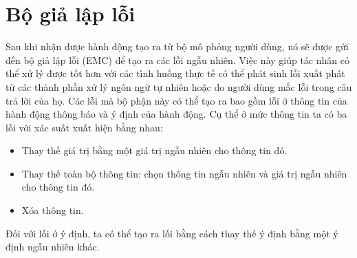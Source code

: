 \section{Bộ giả lập lỗi}
\label{sec:emc}
Sau khi nhận được hành động tạo ra từ bộ mô phỏng người dùng, nó sẽ
được gửi đến bộ giả lập lỗi (EMC) để tạo ra các lỗi ngẫu nhiên.
Việc này giúp tác nhân có thể xử lý được tốt hơn với các tình huống
thực tế có thể phát sinh lỗi xuất phát từ các thành phần xử lý ngôn ngữ
tự nhiên hoặc do người dùng mắc lỗi trong câu trả lời của họ. Các lỗi
mà bộ phận này có thể tạo ra bao gồm lỗi ở thông tin của hành động
thông báo và ý định của hành động. Cụ thể ở mức thông tin ta có ba lỗi
với xác suất xuất hiện bằng nhau:

\begin{itemize}
    \item Thay thế giá trị bằng một giá trị ngẫu nhiên cho thông tin đó.
    \item Thay thế toàn bộ thông tin: chọn thông tin ngẫu nhiên và
    giá trị ngẫu nhiên cho thông tin đó.
    \item Xóa thông tin.
\end{itemize}

Đối với lỗi ở ý định, ta có thể tạo ra lỗi bằng cách thay thế ý định
bằng một ý định ngẫu nhiên khác.
